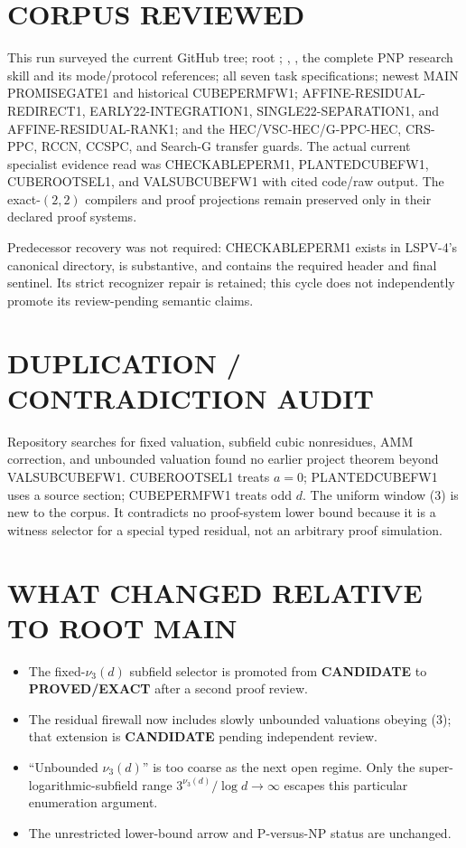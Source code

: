 \documentclass[11pt]{article}
\newcommand{\EXACT}{\textbf{PROVED/EXACT}}
\newcommand{\CAND}{\textbf{CANDIDATE}}
\begin{document}
\section{CORPUS REVIEWED}
This run surveyed the current GitHub tree; root ;
, , the complete PNP research skill and its
mode/protocol references; all seven task specifications; newest MAIN
PROMISEGATE1 and historical CUBEPERMFW1; AFFINE-RESIDUAL-REDIRECT1,
EARLY22-INTEGRATION1, SINGLE22-SEPARATION1, and AFFINE-RESIDUAL-RANK1; and the
HEC/VSC-HEC/G-PPC-HEC, CRS-PPC, RCCN, CCSPC, and Search-G transfer guards.
The actual current specialist evidence read was CHECKABLEPERM1,
PLANTEDCUBEFW1, CUBEROOTSEL1, and VALSUBCUBEFW1 with cited code/raw output.
The exact-$(2,2)$ compilers and proof projections remain preserved only in
their declared proof systems.

Predecessor recovery was not required: CHECKABLEPERM1 exists in LSPV-4's
canonical directory, is substantive, and contains the required header and
final sentinel.  Its strict recognizer repair is retained; this cycle does
not independently promote its review-pending semantic claims.

\section{DUPLICATION / CONTRADICTION AUDIT}
Repository searches for fixed valuation, subfield cubic nonresidues, AMM
correction, and unbounded valuation found no earlier project theorem beyond
VALSUBCUBEFW1.  CUBEROOTSEL1 treats $a=0$; PLANTEDCUBEFW1 uses a source
section; CUBEPERMFW1 treats odd $d$.  The uniform window (3) is new to the
corpus.  It contradicts no proof-system lower bound because it is a witness
selector for a special typed residual, not an arbitrary proof simulation.

\section{WHAT CHANGED RELATIVE TO ROOT MAIN}
\begin{itemize}
\item The fixed-$\nu_3(d)$ subfield selector is promoted from \CAND{} to
\EXACT{} after a second proof review.
\item The residual firewall now includes slowly unbounded valuations obeying
(3); that extension is \CAND{} pending independent review.
\item ``Unbounded $\nu_3(d)$'' is too coarse as the next open regime.  Only
the super-logarithmic-subfield range $3^{\nu_3(d)}/\log d\to\infty$ escapes
this particular enumeration argument.
\item The unrestricted lower-bound arrow and P-versus-NP status are unchanged.
\end{itemize}
\end{document}
